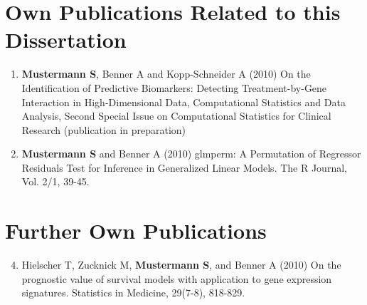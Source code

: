 
\section*{Own Publications Related to this Dissertation}

\begin{enumerate}

\item {\bf{Mustermann S}}, Benner A and Kopp-Schneider A (2010) On the Identification of Predictive Biomarkers: Detecting Treatment-by-Gene Interaction in High-Dimensional Data, Computational Statistics and Data Analysis, Second Special Issue on Computational Statistics for Clinical Research (publication in preparation)

\item {\bf{Mustermann S}} and Benner A (2010) glmperm: A Permutation of Regressor Residuals Test for Inference in
Generalized Linear Models. The R Journal, Vol. 2/1, 39-45. 

\end{enumerate}


\section*{Further Own Publications}
\begin{enumerate}
\setcounter{enumi}{3}

\item 
Hielscher T, Zucknick M, {\bf{Mustermann S}}, and Benner A (2010) 
On the prognostic value of survival models with application to gene expression signatures. 
Statistics in Medicine, 29(7-8), 818-829.
\end{enumerate}
	